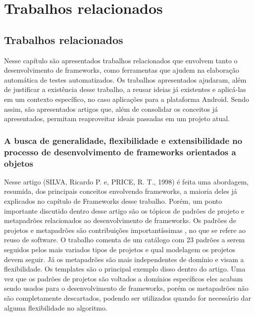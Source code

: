 \documentclass[
    12pt,       %
    openright,      %
    twoside,      %
    a4paper,      %
    english,      %
    french,       %
    spanish,      %
    brazil,       %
    ]{abntex2}
\begin{document}
  \part{Trabalhos relacionados}

  \chapter{Trabalhos relacionados}
    Nesse capítulo são apresentados trabalhos relacionados que envolvem tanto o desenvolvimento de frameworks,
    como ferramentas que ajudem na elaboração automática de testes automatizados. Os trabalhos apresentados
    ajudaram, além de justificar a existência desse trabalho, a reusar ideias já existentes e aplicá-las em um
    contexto específico, no caso aplicações para a plataforma Android. Sendo assim, são apresentados artigos
    que, além de consolidar os conceitos já apresentados, permitam reaproveitar ideais passadas em um projeto atual.

    \section{A busca de generalidade, flexibilidade e extensibilidade no processo de desenvolvimento de frameworks orientados a objetos}
      Nesse artigo (SILVA, Ricardo P. e, PRICE, R. T., 1998) é feita uma abordagem, resumida, dos principais conceitos envolvendo frameworks, a
      maioria deles já explicados no capítulo de Frameworks desse trabalho. Porém, um ponto importante
      discutido dentro desse artigo são os tópicos de padrões de projeto e metapadrões relacionados
      ao desenvolvimento de frameworks. Os padrões de projetos e metapadrões são contribuições
      importantíssimas , no que se refere ao reuso de software. O trabalho comenta de um catálogo com
      23 padrões a serem seguidos pelos mais variados tipos de projetos e qual modelagem os projetos devem
      seguir. Já os metapadrões são mais independentes de domínio e visam a flexibilidade. Os templates são o
      principal exemplo disso dentro do artigo. Uma vez que os padrões de projetos são voltados a domínios
      específicos eles acabam sendo usados para o desenvolvimento de frameworks, porém os metapadrões não são
      completamente descartados, podendo ser utilizados quando for necessário dar alguma flexibilidade no
      algoritmo.
\end{document}
